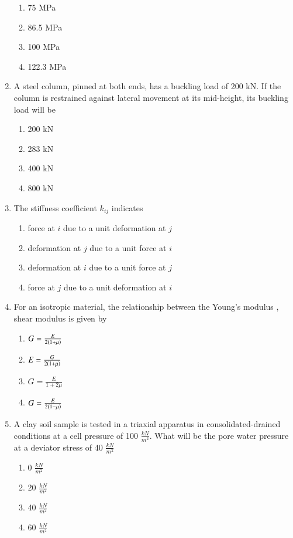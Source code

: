 \documentclass[journal]{IEEEtran}
\begin{document}
\begin{enumerate}
\begin{enumerate}
			\item 75 MPa
			\item 86.5 MPa
			\item 100 MPa
			\item 122.3 MPa
		\end{enumerate}
	\item
	A steel column, pinned at both ends, has a buckling load of 200 kN. If the column is restrained against lateral movement at its mid-height, its buckling load will be 
		\begin{enumerate}
			\item 200 kN
			\item 283 kN
			\item 400 kN
			\item 800 kN
		\end{enumerate}
	\item
	The stiffness coefficient $k_{ij}$ indicates
		\begin{enumerate}
			\item force at $i$ due to a unit deformation at $j$
			\item deformation at $j$ due to a unit force at $i$
			\item deformation at $i$ due to a unit force at $j$
			\item force at $j$ due to a unit deformation at $i$
		\end{enumerate}
	\item
	For an isotropic material, the relationship between the Young's modulus , shear modulus \brak{$\mu$} is given by 
		\begin{enumerate}
			\item $G = \frac{E}{2\left(1+\mu\right)}$
			\item $E = \frac{G}{2\left(1+\mu\right)}$
			\item $G = \frac{E}{1 + 2\mu}$
			\item $G = \frac{E}{2\left(1-\mu\right)}$
		\end{enumerate}
	\item
	A clay soil sample is tested in a triaxial apparatus in consolidated-drained conditions at a cell pressure of 100 $\frac{kN}{m^2}$. What will be the pore water pressure at a deviator stress of 40 $\frac{kN}{m^2}$
		\begin{enumerate}
			\item 0 $\frac{kN}{m^2}$
			\item 20 $\frac{kN}{m^2}$
			\item 40 $\frac{kN}{m^2}$
			\item 60 $\frac{kN}{m^2}$

\end{enumerate}
\end{enumerate}
\end{document}
